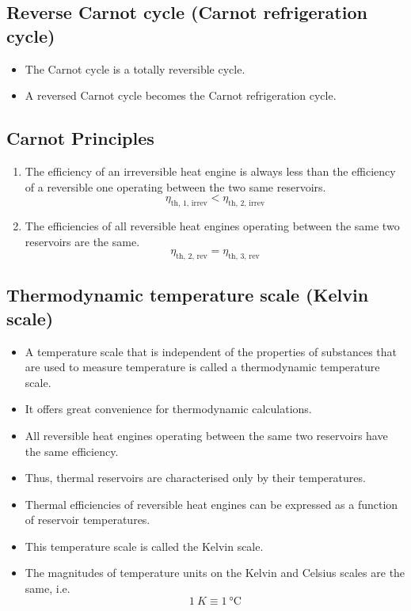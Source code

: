 \documentclass[11pt]{article}
\begin{document}
\subsection{Reverse Carnot cycle (Carnot refrigeration cycle)}
\label{sec:org18366bf}
\begin{itemize}
\item The Carnot cycle is a totally reversible cycle.
\item A reversed Carnot cycle becomes the Carnot refrigeration cycle.
\end{itemize}

\subsection{Carnot Principles}
\label{sec:org8447991}
\begin{enumerate}
\item The efficiency of an irreversible heat engine is always less than the efficiency of a reversible one operating between the two same reservoirs.
\[\eta_{\text{th, 1, irrev}} < \eta_{\text{th, 2, irrev}}\]
\item The efficiencies of all reversible heat engines operating between the same two reservoirs are the same.
\[\eta_{\text{th, 2, rev}} = \eta_{\text{th, 3, rev}}\]
\end{enumerate}

 \newpage

\subsection{Thermodynamic temperature scale (Kelvin scale)}
\label{sec:orgd8af4aa}
\begin{itemize}
\item A temperature scale that is independent of the properties of substances that are used to measure temperature is called a thermodynamic temperature scale.
\item It offers great convenience for thermodynamic calculations.
\item All reversible heat engines operating between the same two reservoirs have the same efficiency.
\item Thus, thermal reservoirs are characterised only by their temperatures.
\item Thermal efficiencies of reversible heat engines can be expressed as a function of reservoir temperatures.
\item This temperature scale is called the Kelvin scale.
\item The magnitudes of temperature units on the Kelvin and Celsius scales are the same, i.e.
\[\qty{1}{K} \equiv \qty{1}{\degreeCelsius}\]
\end{itemize}
\end{document}
